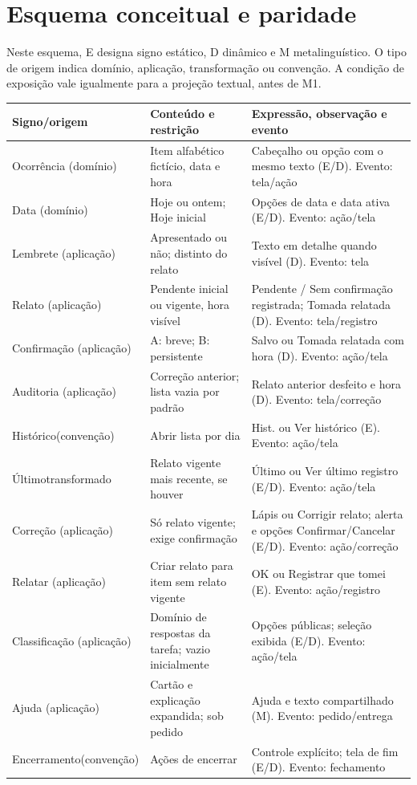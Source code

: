 \section{Esquema conceitual e paridade}\label{ap:signos}
Neste esquema, E designa signo estático, D dinâmico e M metalinguístico. O tipo de origem indica domínio, aplicação, transformação ou convenção. A condição de exposição vale igualmente para a projeção textual, antes de M1.

\begin{center}\small
\begin{tabularx}{\columnwidth}{@{}P{.22\columnwidth}YY@{}}\toprule
Signo/origem & Conteúdo e restrição & Expressão, observação e evento\\\midrule
Ocorrência (domínio) & Item alfabético fictício, data e hora & Cabeçalho ou opção com o mesmo texto (E/D). Evento: tela/ação\\
Data (domínio) & Hoje ou ontem; Hoje inicial & Opções de data e data ativa (E/D). Evento: ação/tela\\
Lembrete (aplicação) & Apresentado ou não; distinto do relato & Texto em detalhe quando visível (D). Evento: tela\\
Relato (aplicação) & Pendente inicial ou vigente, hora visível & Pendente / Sem confirmação registrada; Tomada relatada (D). Evento: tela/registro\\
Confirmação (aplicação) & A: breve; B: persistente & Salvo ou Tomada relatada com hora (D). Evento: ação/tela\\
Auditoria (aplicação) & Correção anterior; lista vazia por padrão & Relato anterior desfeito e hora (D). Evento: tela/correção\\
Histórico\newline (convenção) & Abrir lista por dia & Hist. ou Ver histórico (E). Evento: ação/tela\\
Último\newline transformado & Relato vigente mais recente, se houver & Último ou Ver último registro (E/D). Evento: ação/tela\\
Correção (aplicação) & Só relato vigente; exige confirmação & Lápis ou Corrigir relato; alerta e opções Confirmar/Cancelar (E/D). Evento: ação/correção\\
Relatar (aplicação) & Criar relato para item sem relato vigente & OK ou Registrar que tomei (E). Evento: ação/registro\\
Classificação (aplicação) & Domínio de respostas da tarefa; vazio inicialmente & Opções públicas; seleção exibida (E/D). Evento: ação/tela\\
Ajuda (aplicação) & Cartão e explicação expandida; sob pedido & Ajuda e texto compartilhado (M). Evento: pedido/entrega\\
Encerramento\newline (convenção) & Ações de encerrar & Controle explícito; tela de fim (E/D). Evento: fechamento\\\bottomrule
\end{tabularx}
\end{center}

